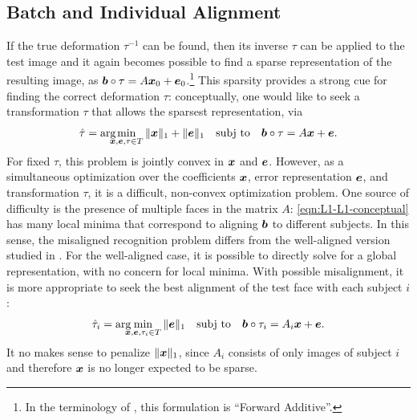 \subsection{Batch and Individual Alignment} If the
true deformation $\tau^{-1}$ can be found, then
its inverse $\tau$ can be applied to the test image and it again becomes
possible to find a sparse representation of the resulting
image, as $\boldsymbol{b} \circ \tau = A {\boldsymbol{x}}_0 + \boldsymbol{e}_0$.\footnote{In the terminology of \cite{baker2004lucas}, this formulation is ``Forward Additive''.}
  This sparsity
provides a strong cue for finding the correct deformation
$\tau$: conceptually, one would like to seek a transformation
$\tau$ that allows the sparsest representation, via
\begin{equation} \label{eqn:L1-L1-conceptual}
\hat{\tau} = \arg\hspace{-2.5mm}\min_{\x,\e,\tau \in T} \| \x \|_1 + \| \e \|_1 \quad \subj \quad \bb \circ \tau = A \x + \e.
\end{equation}
For fixed $\tau$, this problem is jointly convex in ${\boldsymbol{x}}$ and
$\boldsymbol{e}$. However, as a simultaneous optimization over the
coefficients ${\boldsymbol{x}}$, error representation $\boldsymbol{e}$, and
transformation $\tau$, it is a difficult, non-convex
optimization problem. One source of difficulty is the presence
of multiple faces in the matrix $A$:
\eqref{eqn:L1-L1-conceptual} has many local minima that
correspond to aligning $\boldsymbol{b}$ to different subjects. In this
sense, the misaligned recognition problem differs from the
well-aligned version studied in \cite{Wright2009-PAMI}. For the
well-aligned case, it is possible to directly solve for a
global representation, with no concern for local minima. With
possible misalignment, it is more appropriate to seek the best
alignment of the test face with each subject $i$:
\begin{equation} \label{eqn:per-subject-L1}
\hat \tau_i = \arg\hspace{-2.5mm}\min_{\x,\e,\tau_i \in T} \| \e \|_1 \quad \subj \quad \bb \circ \tau_i = A_i \x + \e.
\end{equation}
It no makes sense to penalize $\| {\boldsymbol{x}} \|_1$, since $A_i$ consists of
only images of subject $i$ and therefore ${\boldsymbol{x}}$ is no longer expected to
be sparse.

